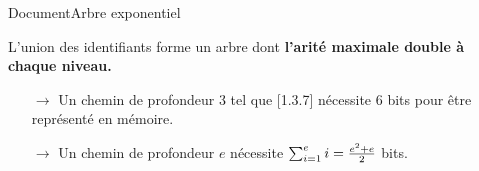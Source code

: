 \begin{frame}{Document}{Arbre exponentiel}

  \begin{minipage}{0.55\textwidth}
    L'union des identifiants forme un arbre dont \textbf{l'arité maximale double
      à chaque niveau.}
    
    \begin{itemize}
    \item [$\rightarrow$] Un chemin de profondeur 3 tel que [1.3.7] nécessite
      $6$ bits pour être représenté en mémoire.
    \item [$\rightarrow$] Un chemin de profondeur $e$ nécessite
      $\sum_{i=1}^e i = {e^2 + e \over 2}$ bits.
  \end{itemize}
  \end{minipage}
  \hfill
  \begin{minipage}{0.40\textwidth}
    \begin{center}
      
    \end{center}
  \end{minipage}



\end{frame}
